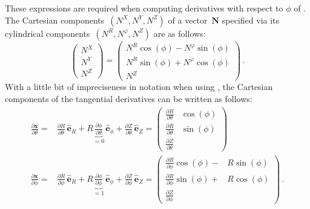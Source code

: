 These expressions are required when computing derivatives with respect to $\phi$ of .
The Cartesian components~$(N^X, N^Y, N^Z)$ of a vector~$\mathbf{N}$ specified via its cylindrical components~$(N^R, N^\varphi, N^Z)$ are as follows:
\begin{equation}
 \left( \begin{matrix}
    N^X \\
    N^Y \\
    N^Z
 \end{matrix} \right)
 =
 \left( \begin{matrix}
   N^R \cos(\phi) - N^\varphi  \sin(\phi) \\
   N^R \sin(\phi) + N^\varphi  \cos(\phi) \\
   N^Z
 \end{matrix} \right) \, .
\end{equation}
With a little bit of impreciseness in notation when using , the Cartesian components of the tangential derivatives can be written as follows:
\begin{align}
  \frac{\partial \mathbf{x}}{\partial \theta} =&                 \frac{\partial R}{\partial \theta} \, \hat{\mathbf{e}}_R
                                                 + R \underbrace{\frac{\partial \phi}{\partial \theta}}_{=0} \, \hat{\mathbf{e}}_\phi
                                                 +               \frac{\partial Z}{\partial \theta} \, \hat{\mathbf{e}}_Z
                                              = \left( \begin{aligned}
                                                  \frac{\partial R}{\partial \theta} & \cos(\phi)  \\
                                                  \frac{\partial R}{\partial \theta} & \sin(\phi)  \\
                                                  \frac{\partial Z}{\partial \theta} & ~
                                                \end{aligned} \right) \label{eqn:dXdt} \\
  \frac{\partial \mathbf{x}}{\partial \phi}   =&                 \frac{\partial R   }{\partial \phi} \, \hat{\mathbf{e}}_R
                                                 + R \underbrace{\frac{\partial \phi}{\partial \phi}}_{=1} \, \hat{\mathbf{e}}_\phi
                                                 +               \frac{\partial Z   }{\partial \phi} \, \hat{\mathbf{e}}_Z
                                              = \left( \begin{aligned}
                                                  \frac{\partial R}{\partial \phi} \cos(\phi) -& R \sin(\phi) \\
                                                  \frac{\partial R}{\partial \phi} \sin(\phi) +& R \cos(\phi) \\
                                                  \frac{\partial Z}{\partial \phi}             & ~
                                                \end{aligned} \right) \label{eqn:dXdp} \, .
\end{align}
